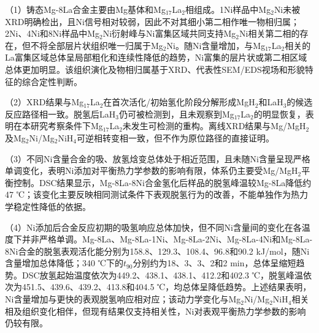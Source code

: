 \documentclass[UTF8,10pt]{ctexart}
\begin{document}
（1）铸态Mg-8La合金主要由Mg基体和Mg$_{17}$La$_2$相组成。1Ni样品中Mg$_2$Ni未被XRD明确检出，且Ni信号相对较弱，因此不对其细小第二相作唯一物相归属；2Ni、4Ni和8Ni样品中Mg$_2$Ni衍射峰与Ni富集区域共同支持Mg$_2$Ni相关第二相的存在，但不将全部层片状组织唯一归属于Mg$_2$Ni。随Ni含量增加，与Mg$_{17}$La$_2$相关的La富集区域总体呈局部粗化和连续性降低的趋势，Ni富集的层片状或第二相区域总体更加明显。该组织演化及物相归属基于XRD、代表性SEM/EDS视场和形貌特征的综合定性判断。

（2）XRD结果与Mg$_{17}$La$_2$在首次活化/初始氢化阶段分解形成MgH$_2$和LaH$_3$的候选反应路径相一致。脱氢后LaH$_3$仍可被检测到，且未观察到Mg$_{17}$La$_2$的明显恢复，表明在本研究考察条件下Mg$_{17}$La$_2$未发生可检测的重构。离线XRD结果与Mg/MgH$_2$及Mg$_2$Ni/Mg$_2$NiH$_4$可逆相转变相一致，但不作为原位路径的直接证明。

（3）不同Ni含量合金的吸、放氢焓变总体处于相近范围，且未随Ni含量呈现严格单调变化，表明Ni添加对平衡热力学参数的影响有限，体系仍主要受Mg/MgH$_2$平衡控制。DSC结果显示，Mg-8La-8Ni合金氢化后样品的脱氢峰温较Mg-8La降低约47 ℃；该变化主要反映相同测试条件下表观脱氢行为的改善，不能单独作为热力学稳定性降低的依据。

（4）Ni添加后合金反应初期的吸氢响应总体加快，但不同Ni含量间的变化在各温度下并非严格单调。Mg-8La、Mg-8La-1Ni、Mg-8La-2Ni、Mg-8La-4Ni和Mg-8La-8Ni合金的脱氢表观活化能分别为158.8、129.3、108.4、96.8和90.2 kJ/mol，随Ni含量增加总体降低；340 ℃下的$t_{90}$分别约为18、3、3、2和2 min，总体呈缩短趋势。DSC放氢起始温度依次为449.2、438.1、438.1、412.2和402.3 ℃，脱氢峰温依次为451.5、439.6、439.2、413.8和404.5 ℃，均总体呈降低趋势。上述结果表明，Ni含量增加与更快的表观脱氢响应相对应；该动力学变化与Mg$_2$Ni/Mg$_2$NiH$_4$相关相及组织变化相伴，但现有结果仅支持相关性，Ni对表观平衡热力学参数的影响仍较有限。


\begin{rmreferences}


\end{rmreferences}

\makermenglish
\makermmetadata
\end{document}
